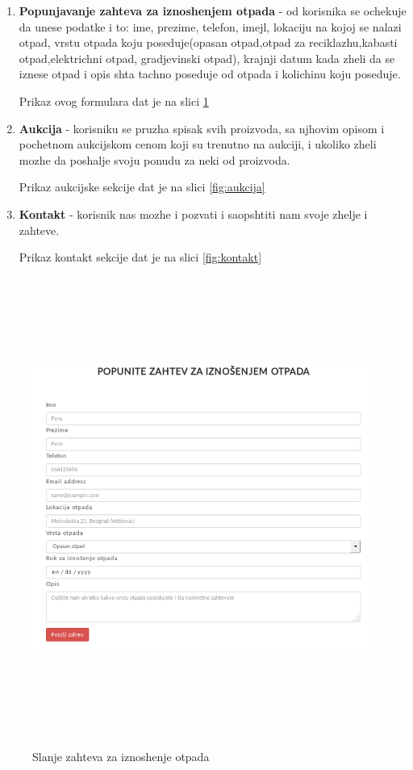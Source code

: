 \documentclass[10 pt]{article}
\begin{document}
		\begin{enumerate}
			\item \textbf{Popunjavanje zahteva za iznoshenjem otpada} - od korisnika se ochekuje da unese podatke i to: ime, prezime, telefon, imejl, lokaciju na kojoj se nalazi otpad, vrstu otpada koju poseduje(opasan otpad,otpad za reciklazhu,kabasti otpad,elektrichni otpad, gradjevinski otpad), krajnji datum kada zheli da se iznese otpad i opis shta tachno poseduje od otpada i kolichinu koju poseduje.
			
			Prikaz ovog formulara dat je na slici \ref{fig:zahtevFormular}
			
			\item\textbf{ Aukcija} - korisniku se pruzha spisak svih proizvoda, sa njhovim opisom i pochetnom aukcijskom cenom koji su trenutno na aukciji, i ukoliko zheli mozhe da poshalje svoju ponudu za neki od proizvoda.
			
			Prikaz aukcijske sekcije dat je na slici \ref{fig:aukcija}
			
			\item \textbf{Kontakt} - korisnik nas mozhe i pozvati i saopshtiti nam svoje zhelje i zahteve.
			
			Prikaz kontakt sekcije dat je na slici \ref{fig:kontakt}
		\end{enumerate} 
	
		\begin{figure}[H]
			\centering
			\includegraphics[width=15cm,height=15cm,keepaspectratio]{GUI/formularZaSlanjeZahteva.png}\\
			\caption{Slanje zahteva za iznoshenje otpada}
			\label{fig:zahtevFormular}
		\end{figure}
	
\end{document}
